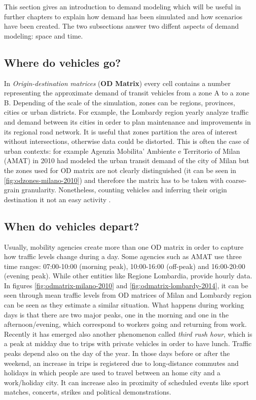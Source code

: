 This section gives an introduction to demand modeling which will be useful in further chapters to explain how demand has been simulated and how scenarios have been created.
The two subsections answer two diffent aspects of demand modeling: space and time.

\subsection{Where do vehicles go?}

In \textit{Origin-destination matrices} (\textbf{OD Matrix}) every cell contains a number representing the approximate demand of transit vehicles from a zone A to a zone B. Depending of the scale of the simulation, zones can be regions, provinces, cities or urban districts.
For example, the Lombardy region yearly analyze traffic and demand \cite{ODLombardia2014} between its cities in order to plan maintenance and improvements in its regional road network.
It is useful that zones partition the area of interest without intersections, otherwise data could be distorted. This is often the case of urban contexts: for example Agenzia Mobilita' Ambiente e Territorio of Milan (AMAT) in 2010 \cite{ODMilano2010} had modeled the urban transit demand of the city of Milan but the zones used for OD matrix are not clearly distinguished (it can be seen in \ref{fig:odzones-milano-2010}) and therefore the matrix has to be taken with coarse-grain granularity.
Nonetheless, counting vehicles and inferring their origin destination it not an easy activity \cite{bell1983estimation}.

\subsection{When do vehicles depart?}

Usually, mobility agencies create more than one OD matrix in order to capture how traffic levels change during a day.
Some agencies such as AMAT use three time ranges: 07:00-10:00 (morning peak), 10:00-16:00 (off-peak) and 16:00-20:00 (evening peak). 
While other entities like Regione Lombardia, provide hourly data.
In figures \ref{fig:odmatrix-milano-2010} and \ref{fig:odmatrix-lombardy-2014}, it can be seen through mean traffic levels from OD matrices of Milan and Lombardy region can be seen as they estimate a similar situation.
What happens during working days is that there are two major peaks, one in the morning and one in the afternoon/evening, which correspond to workers going and returning from work.
Recently it has emerged also another phenomenon called \textit{third rush hour}, which is a peak at midday due to trips with private vehicles in order to have lunch.
Traffic peaks depend also on the day of the year. In those days before or after the weekend, an increase in trips is registered due to long-distance commutes and holidays in which people are used to travel between an home city and a work/holiday city. It can increase also in proximity of scheduled events like sport matches, concerts, strikes and political demonstrations.

